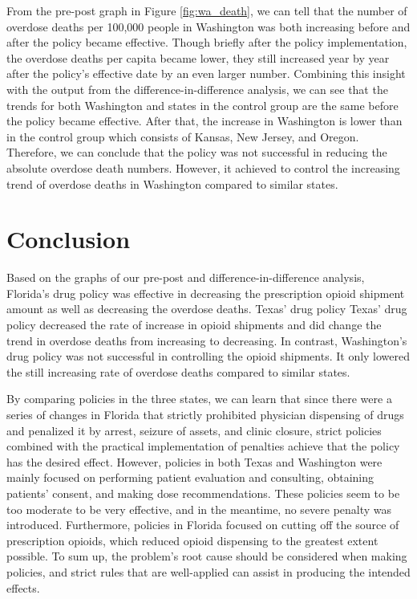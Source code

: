 \documentclass[12pt,letterpaper]{article}
\begin{document}
From the pre-post graph in Figure \ref{fig:wa_death}, we can tell that the number of overdose deaths per 100,000 people in Washington was both increasing before and after the policy became effective. Though briefly after the policy implementation, the overdose deaths per capita became lower, they still increased year by year after the policy's effective date by an even larger number. Combining this insight with the output from the difference-in-difference analysis, we can see that the trends for both Washington and states in the control group are the same before the policy became effective. After that, the increase in Washington is lower than in the control group which consists of Kansas, New Jersey, and Oregon. Therefore, we can conclude that the policy was not successful in reducing the absolute overdose death numbers. However, it achieved to control the increasing trend of overdose deaths in Washington compared to similar states.


\section{Conclusion}


Based on the graphs of our pre-post and difference-in-difference analysis, Florida's drug policy was effective in decreasing the prescription opioid shipment amount as well as decreasing the overdose deaths. Texas' drug policy Texas' drug policy decreased the rate of increase in opioid shipments and did change the trend in overdose deaths from increasing to decreasing. In contrast, Washington's drug policy was not successful in controlling the opioid shipments. It only lowered the still increasing rate of overdose deaths compared to similar states.

By comparing policies in the three states, we can learn that since there were a series of changes in Florida that strictly prohibited physician dispensing of drugs and penalized it by arrest, seizure of assets, and clinic closure, strict policies combined with the practical implementation of penalties achieve that the policy has the desired effect. However, policies in both Texas and Washington were mainly focused on performing patient evaluation and consulting, obtaining patients' consent, and making dose recommendations. These policies seem to be too moderate to be very effective, and in the meantime, no severe penalty was introduced. Furthermore, policies in Florida focused on cutting off the source of prescription opioids, which reduced opioid dispensing to the greatest extent possible. To sum up, the problem's root cause should be considered when making policies, and strict rules that are well-applied can assist in producing the intended effects.
\end{document}
